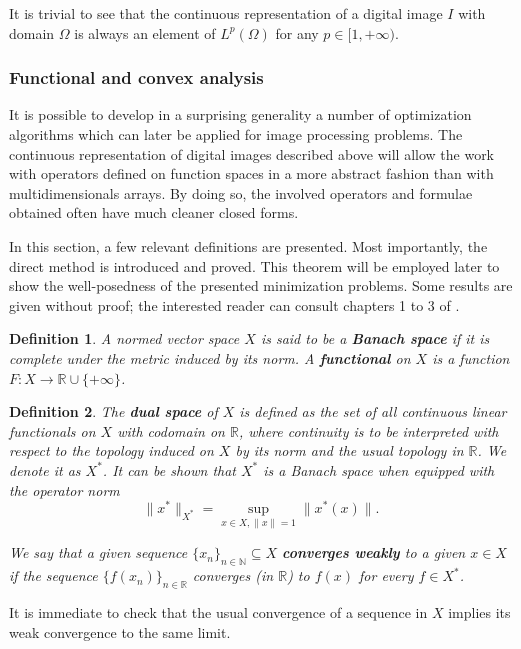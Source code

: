 \documentclass[twocolumn,twoside,a4paper,10pt]{IEEEtran}
\newtheorem{definition}{Definition}
\begin{document}
It is trivial to see that the continuous representation of a digital image \(I\) with domain \(\Omega\) is always an element of \(L^p(\Omega)\) for any \(p\in[1, +\infty)\).

\subsubsection{Functional and convex analysis} It is possible to develop in a surprising generality a number of optimization algorithms which can later be applied for image processing problems. The continuous representation of digital images described above will allow the work with operators defined on function spaces in a more abstract fashion than with multidimensionals arrays. By doing so, the involved operators and formulae obtained often have much cleaner closed forms. 

In this section, a few relevant definitions are presented. Most importantly, the direct method is introduced and proved. This theorem will be employed later to show the well-posedness of the presented minimization problems. Some results are given without proof; the interested reader can consult chapters 1 to 3 of \cite{clason2024introductionnonsmoothanalysisoptimization}.

\begin{definition}
  A normed vector space \(X\) is said to be a \textbf{Banach space} if it is complete under the metric induced by its norm. A \textbf{functional} on \(X\) is a function \(F\colon X\to\mathbb{R}\cup\{+\infty\}\).
\end{definition}

\begin{definition}
  The \textbf{dual space} of \(X\) is defined as the set of all continuous linear functionals on \(X\) with codomain on \(\mathbb{R}\), where continuity is to be interpreted with respect to the topology induced on \(X\) by its norm and the usual topology in \(\mathbb{R}\). We denote it as \(X^*\). It can be shown that \(X^*\) is a Banach space when equipped with the operator norm
  \[
    \|x^*\|_{X^*} = \sup_{x\in X, \|x\|=1}\|x^*(x)\|
  .\]

  We say that a given sequence \(\{x_n\}_{n\in\mathbb{N}}\subseteq X\) \textbf{converges weakly} to a given \(x\in X\) if the sequence \(\{f(x_n)\}_{n\in\mathbb{R}}\) converges (in \(\mathbb{R}\)) to \(f(x)\) for every \(f\in X^*\).
\end{definition}

It is immediate to check that the usual convergence of a sequence in \(X\) implies its weak convergence to the same limit.
\end{document}
